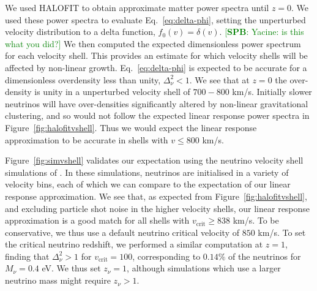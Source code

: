 \documentclass[useAMS, usenatbib]{mnras}
\newcommand{\barr}{\begin{eqnarray}}
\newcommand{\earr}{\end{eqnarray}}
\newcommand{\spb}[1]{{\textcolor{green}{[{\bf SPB}: #1]}}}
\begin{document}
We used {\small HALOFIT} \cite{Smith_2003} to obtain approximate matter power spectra until $z=0$. We used these power spectra to evaluate Eq.~\ref{eq:delta-phi}, setting the unperturbed velocity distribution to a delta function, $f_0(v) = \delta(v)$. \spb{Yacine: is this what you did?} We then computed the expected dimensionless power spectrum for each velocity shell. This provides an estimate for which velocity shells will be affected by non-linear growth. Eq.~\ref{eq:delta-phi} is expected to be accurate for a dimensionless overdensity less than unity, $\Delta_\nu^2 < 1$. We see that at $z=0$ the over-density is unity in a unperturbed velocity shell of $700 - 800$ km/s. Initially slower neutrinos will have over-densities significantly altered by non-linear gravitational clustering, and so would not follow the expected linear response power spectra in Figure~\ref{fig:halofitvshell}. Thus we would expect the linear response approximation to be accurate in shells with $v \leq 800$ km/s.

Figure~\ref{fig:simvshell} validates our expectation using the neutrino velocity shell simulations of \cite{Banerjee_2018}. In these simulations, neutrinos are initialised in a variety of velocity bins, each of which we can compare to the expectation of our linear response approximation. We see that, as expected from Figure~\ref{fig:halofitvshell}, and excluding particle shot noise in the higher velocity shells, our linear response approximation is a good match for all shells with $v_\mathrm{crit} \geq 838$ km/s. To be conservative, we
thus use a default neutrino critical velocity of $850$ km/s. To set the critical neutrino redshift, we performed a similar computation at $z=1$, finding that $\Delta_\nu^2 > 1$ for $v_\mathrm{crit} = 100$, corresponding to $0.14\%$ of the neutrinos for $M_\nu  = 0.4$ eV. We thus set $z_\nu = 1$, although simulations which use a larger neutrino mass might require $z_\nu > 1$.

\end{document}
